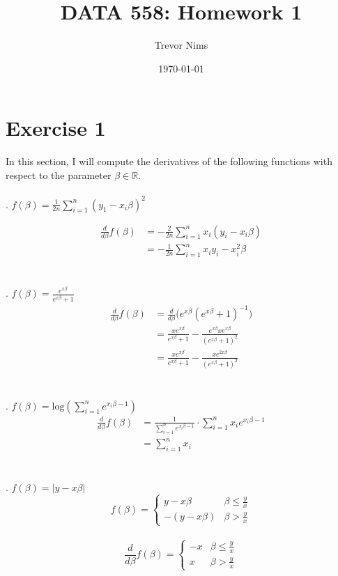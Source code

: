 \documentclass{article}
\title{DATA 558: Homework 1}
\author{Trevor Nims}
\date\today
\begin{document}
\maketitle

\section*{Exercise 1}
In this section, I will compute the derivatives of the following functions with respect to the parameter $\beta \in \mathbb{R}$.
\\\\
. $f(\beta) = \frac{1}{2n}\sum_{i=1}^{n}(y_1-x_i\beta)^2$

\begin{align*}
	\frac{d}{d\beta}f(\beta) &= -\frac{2}{2n}\sum_{i=1}^{n} x_i(y_i-x_i\beta) \\
	&= -\frac{1}{2n}\sum_{i=1}^{n} x_iy_i-x_i^2\beta
\end{align*}
\\\\
. $f(\beta) = \frac{e^{x\beta}}{e^{x\beta}+1}$
\begin{align*}
	\frac{d}{d\beta}f(\beta) &=	\frac{d}{d\beta}\bigg(e^{x\beta}(e^{x\beta}+1)^{-1}\bigg) \\
	&= \frac{xe^{x\beta}}{e^{x\beta}+1}-\frac{e^{x\beta}xe^{x\beta}}{(e^{x\beta}+1)^2} \\
	&= \frac{xe^{x\beta}}{e^{x\beta}+1}-\frac{xe^{2x\beta}}{(e^{x\beta}+1)^2} 
\end{align*}
\\\\
. $f(\beta) = \text{log}(\sum_{i=1}^{n}e^{x_i\beta-1})$
\begin{align*}
	\frac{d}{d\beta}f(\beta) &= \frac{1}{\sum_{i=1}^{n}e^{x_i\beta-1}}\cdot\sum_{i=1}^{n}x_ie^{x_i\beta-1} \\
	&= \sum_{i=1}^{n}x_i
\end{align*}
\\\\
. $f(\beta) = |y-x\beta|$
\\
\[f(\beta) =  \begin{cases}
	y-x\beta & \beta \leq \frac{y}{x} \\
	-(y-x\beta) & \beta > \frac{y}{x}
\end{cases}
\] \\

\[ \frac{d}{d\beta}f(\beta) =  \begin{cases}
	-x & \beta \leq \frac{y}{x} \\
	x & \beta > \frac{y}{x}
\end{cases}
\] \\
\end{document}
